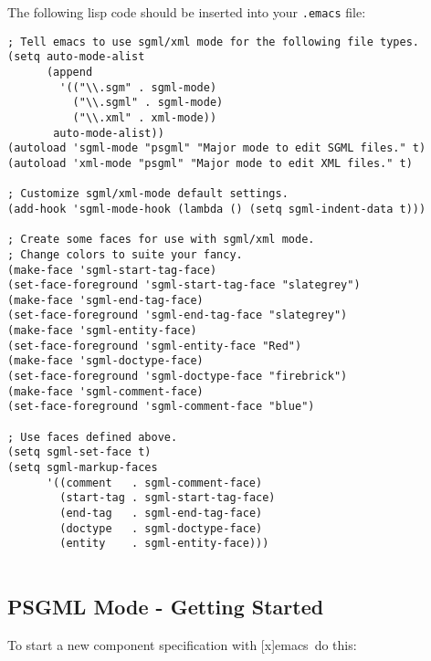 \documentclass{article}
\newcommand{\filename}[1]{\texttt{#1}}
\newcommand{\emacs}{[x]emacs}
\newcommand{\SUBSECgettingStarted}{PSGML Mode - Getting Started}
\begin{document}
The following lisp code should be inserted into your \filename{.emacs}
file:

\begin{verbatim}
; Tell emacs to use sgml/xml mode for the following file types.
(setq auto-mode-alist
      (append
        '(("\\.sgm" . sgml-mode)
          ("\\.sgml" . sgml-mode)
          ("\\.xml" . xml-mode))
       auto-mode-alist))
(autoload 'sgml-mode "psgml" "Major mode to edit SGML files." t)
(autoload 'xml-mode "psgml" "Major mode to edit XML files." t) 

; Customize sgml/xml-mode default settings.
(add-hook 'sgml-mode-hook (lambda () (setq sgml-indent-data t)))

; Create some faces for use with sgml/xml mode.
; Change colors to suite your fancy.
(make-face 'sgml-start-tag-face) 
(set-face-foreground 'sgml-start-tag-face "slategrey") 
(make-face 'sgml-end-tag-face) 
(set-face-foreground 'sgml-end-tag-face "slategrey") 
(make-face 'sgml-entity-face) 
(set-face-foreground 'sgml-entity-face "Red") 
(make-face 'sgml-doctype-face) 
(set-face-foreground 'sgml-doctype-face "firebrick") 
(make-face 'sgml-comment-face) 
(set-face-foreground 'sgml-comment-face "blue") 

; Use faces defined above.
(setq sgml-set-face t)
(setq sgml-markup-faces 
      '((comment   . sgml-comment-face) 
        (start-tag . sgml-start-tag-face) 
        (end-tag   . sgml-end-tag-face) 
        (doctype   . sgml-doctype-face) 
        (entity    . sgml-entity-face))) 


\end{verbatim}

\subsection{\SUBSECgettingStarted}
\label{\SUBSECgettingStarted}

To start a new component specification with \emacs\ do this:
\end{document}
